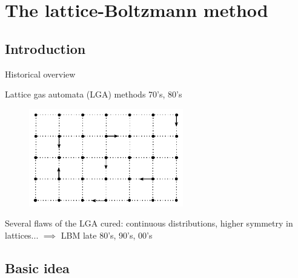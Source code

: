 \section{The lattice-Boltzmann method}

\subsection{Introduction}

\begin{frame}{Historical overview}

\begin{itemize*}

\item Lattice gas automata (LGA) methods 70's, 80's

\begin{figure}
  \centering
\includegraphics[width=0.6\textwidth]{../fig/lga.pdf}
\end{figure}

\item Several flaws of the LGA cured: continuous distributions, higher
  symmetry in lattices... $\implies$ LBM late 80's, 90's, 00's

\end{itemize*}

\end{frame}

\subsection{Basic idea}


